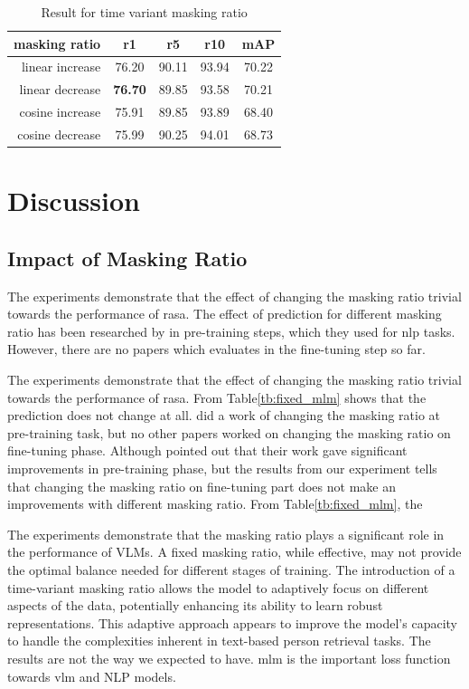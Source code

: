 \begin{table}[htbp]
    \centering
    \caption{Result for time variant masking ratio}
    \begin{tabular}{rcccc}
      \centering
      masking ratio & r1 & r5 & r10 & mAP\\ \hline
      linear increase & 76.20 & 90.11 & 93.94 & 70.22 \\
      linear decrease & \textbf{76.70} & 89.85 & 93.58 & 70.21 \\
      cosine increase & 75.91 & 89.85 & 93.89 & 68.40 \\
      cosine decrease & 75.99 & 90.25 & 94.01 & 68.73 \\
    \end{tabular}
  \end{table}
\section{Discussion}
\subsection{Impact of Masking Ratio}

The experiments demonstrate that the effect of changing the masking ratio trivial towards the performance of \acrshort{rasa}. 
The effect of prediction for different masking ratio has been researched by \cite{yang2023learningbettermaskingbetter} in pre-training steps, which they used for \acrshort{nlp} tasks. However, there are no papers which evaluates in the fine-tuning step so far.


The experiments demonstrate that the effect of changing the masking ratio trivial towards the performance of \acrshort{rasa}. From Table\ref{tb:fixed_mlm} shows that the prediction does not change at all. \cite{yang2023learningbettermaskingbetter} did a work of changing the masking ratio at pre-training task, but no other papers worked on changing the masking ratio on fine-tuning phase. 
Although \cite{yang2023learningbettermaskingbetter} pointed out that their work gave significant improvements in pre-training phase, but the results from our experiment tells that changing the masking ratio on fine-tuning part does not make an improvements with different masking ratio.
From Table\ref{tb:fixed_mlm}, the 

The experiments demonstrate that the masking ratio plays a significant role in the performance of VLMs. A fixed masking ratio, while effective, may not provide the optimal balance needed for different stages of training. The introduction of a time-variant masking ratio allows the model to adaptively focus on different aspects of the data, potentially enhancing its ability to learn robust representations. This adaptive approach appears to improve the model's capacity to handle the complexities inherent in text-based person retrieval tasks.
The results are not the way we expected to have. \acrshort{mlm} is the important loss function towards \acrshort{vlm} and NLP models. 


